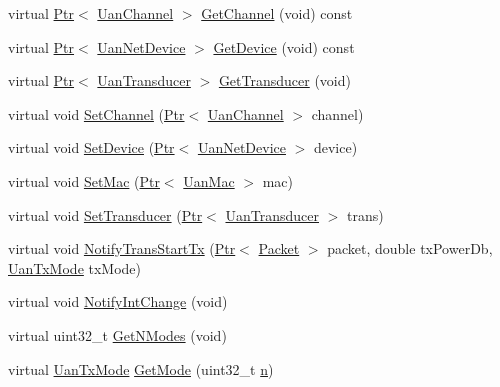 \begin{DoxyCompactItemize}
\item 
virtual \hyperlink{classns3_1_1Ptr}{Ptr}$<$ \hyperlink{classns3_1_1UanChannel}{Uan\+Channel} $>$ \hyperlink{classns3_1_1UanPhyGen_a61cd07812847e608ba7b4109d36fd2b6}{Get\+Channel} (void) const 
\item 
virtual \hyperlink{classns3_1_1Ptr}{Ptr}$<$ \hyperlink{classns3_1_1UanNetDevice}{Uan\+Net\+Device} $>$ \hyperlink{classns3_1_1UanPhyGen_a5abb802c7eec998b42d4a1ffba93248f}{Get\+Device} (void) const 
\item 
virtual \hyperlink{classns3_1_1Ptr}{Ptr}$<$ \hyperlink{classns3_1_1UanTransducer}{Uan\+Transducer} $>$ \hyperlink{classns3_1_1UanPhyGen_a13038b39c5c64d0ac4026aa29b21f05c}{Get\+Transducer} (void)
\item 
virtual void \hyperlink{classns3_1_1UanPhyGen_a4ea06441561b7228b4cbe4504d0a3ca2}{Set\+Channel} (\hyperlink{classns3_1_1Ptr}{Ptr}$<$ \hyperlink{classns3_1_1UanChannel}{Uan\+Channel} $>$ channel)
\item 
virtual void \hyperlink{classns3_1_1UanPhyGen_a805595e47e5de6e00fb4ebf1368a1ff3}{Set\+Device} (\hyperlink{classns3_1_1Ptr}{Ptr}$<$ \hyperlink{classns3_1_1UanNetDevice}{Uan\+Net\+Device} $>$ device)
\item 
virtual void \hyperlink{classns3_1_1UanPhyGen_a9fefd59a5878115e2469970055f72726}{Set\+Mac} (\hyperlink{classns3_1_1Ptr}{Ptr}$<$ \hyperlink{classns3_1_1UanMac}{Uan\+Mac} $>$ mac)
\item 
virtual void \hyperlink{classns3_1_1UanPhyGen_a83b350a5a4d6c6d9e4cfc95e7649c078}{Set\+Transducer} (\hyperlink{classns3_1_1Ptr}{Ptr}$<$ \hyperlink{classns3_1_1UanTransducer}{Uan\+Transducer} $>$ trans)
\item 
virtual void \hyperlink{classns3_1_1UanPhyGen_a9c0dea31745ec14c25d419fb6cec8089}{Notify\+Trans\+Start\+Tx} (\hyperlink{classns3_1_1Ptr}{Ptr}$<$ \hyperlink{classns3_1_1Packet}{Packet} $>$ packet, double tx\+Power\+Db, \hyperlink{classns3_1_1UanTxMode}{Uan\+Tx\+Mode} tx\+Mode)
\item 
virtual void \hyperlink{classns3_1_1UanPhyGen_afe67b08443408f30a5535fb7765def3b}{Notify\+Int\+Change} (void)
\item 
virtual uint32\+\_\+t \hyperlink{classns3_1_1UanPhyGen_a1642b90ac30ddd84c3965f329262d6fb}{Get\+N\+Modes} (void)
\item 
virtual \hyperlink{classns3_1_1UanTxMode}{Uan\+Tx\+Mode} \hyperlink{classns3_1_1UanPhyGen_ac6f7632bf515cf20ce242d8138ae00b8}{Get\+Mode} (uint32\+\_\+t \hyperlink{lte__link__budget__x2__handover__measures_8m_abdb05bc5a064cf642a06c83b3392f148}{n})

\end{DoxyCompactItemize}
